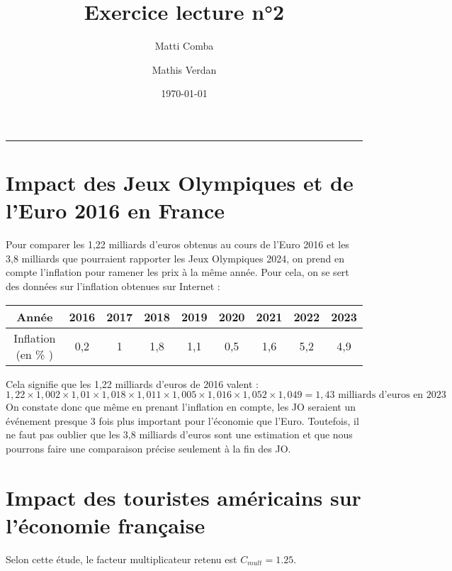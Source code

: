 \documentclass{article}
\title{\Huge \textbf{Exercice lecture n°2}}
\author{Matti Comba \and Mathis Verdan}
\date{\today}
\begin{document}
\maketitle
\begin{center}
  \rule{\linewidth}{0.5mm}
\end{center}


\section{Impact des Jeux Olympiques et de l'Euro 2016 en France}
Pour comparer les 1,22 milliards d'euros obtenus au cours de l'Euro 2016 et les 3,8 milliards que pourraient rapporter les Jeux Olympiques 2024, on prend en compte l'inflation pour ramener les prix à la même année. Pour cela, on se sert des données sur l'inflation obtenues sur Internet : 


\begin{center}
    \begin{tabular}{ | c | c | c |  c |  c |  c |  c |  c |  c | }
      \hline
      Année & 2016 & 2017 & 2018 & 2019 & 2020 & 2021 & 2022 & 2023 \\ \hline
      Inflation (en \% ) & 0,2 & 1 & 1,8 & 1,1 & 0,5 & 1,6 & 5,2 & 4,9 \\ \hline
    \end{tabular}
\end{center}
\vspace{0.5cm}

Cela signifie que les 1,22 milliards d'euros de 2016 valent :
$$ 1,22 \times 1,002 \times 1,01 \times 1,018 \times 1,011 \times 1,005 \times 1,016 \times 1,052 \times 1,049 = 1,43 \text{ milliards d'euros en 2023}$$
On constate donc que même en prenant l'inflation en compte, les JO seraient un événement presque 3 fois plus important pour l'économie que l'Euro. Toutefois, il ne faut pas oublier que les 3,8 milliards d'euros sont une estimation et que nous pourrons faire une comparaison précise seulement à la fin des JO.

\section{Impact des touristes américains sur l'économie française}
  
    Selon cette étude, le facteur multiplicateur retenu est $ C_{mult} = 1.25$. 
    \vspace{0.5cm}
\end{document}
